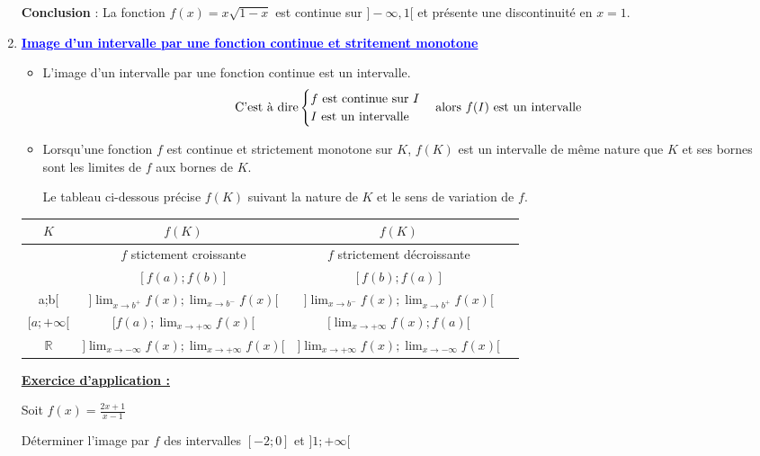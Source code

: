 \documentclass[12pt]{article}
\newcounter{exerciceapp}
\newcommand{\exerciceapp}{%
  \refstepcounter{exerciceapp}%
  \textbf{\textcolor{myorange}{Exercice d'application \theexerciceapp :}} \ignorespaces
}
\begin{document}
\begin{enumerate}[label=\arabic*)]
\textbf{Conclusion} : La fonction \( f(x) = x\sqrt{1 - x} \) est continue sur \( ]-\infty, 1[ \) et présente une discontinuité en \( x = 1 \).

\item \textbf{\textcolor{blue}{\underline{Image d’un intervalle par une fonction continue et stritement monotone}}}
\begin{itemize}
\item L’image d’un intervalle par une fonction continue est un intervalle.
\[
\text{C’est à dire}
\begin{cases}
\text{\( f \) est continue sur \( I \)}\\
\text{\( I \) est un intervalle}
\end{cases}
\text{alors \( f(I) \) est un intervalle}
\]

\item Lorsqu’une fonction \( f \) est continue et strictement monotone sur \( K \), \( f(K) \) est un intervalle de même nature que \( K \) et ses bornes sont les limites de \( f \) aux bornes de \( K \).

Le tableau ci-dessous précise \( f(K) \) suivant la nature de \( K \) et le sens de variation de \( f \).
\end{itemize}
\begin{tabular}{|c|c|c|c|}
\hline
\( K \) & \( f(K) \) & \( f(K) \)\\
\hline
				& \( f \) stictement croissante & \( f \) strictement décroissante\\
\hline
[a;b]		& \( [f(a);f(b)] \) & \( [f(b);f(a)] \)       \\
\hline
[a;b[	& \( [f(a);\lim_{x\to b^{-}}f(x)[ \) &	\( [\lim_{x\to b^{-}}f(x);f(a)[ \)	\\
\hline
]a;b[		& \( ]\lim_{x\to b^{+}}f(x);\lim_{x\to b^{-}}f(x)[ \) &	\( ]\lim_{x\to b^{-}}f(x);\lim_{x\to b^{+}}f(x)[ \)	\\
\hline
\( [a;+\infty[ \)	& \( [f(a);\lim_{x\to +\infty}f(x)[ \) &\( [\lim_{x\to +\infty}f(x);f(a)[ \)		\\
\hline
\( \mathbb{R} \)& \( ]\lim_{x\to -\infty}f(x);\lim_{x\to +\infty}f(x)[ \)&\( ]\lim_{x\to +\infty}f(x);\lim_{x\to -\infty}f(x)[ \)\\
\hline
\end{tabular}

			\textbf{\underline{\exerciceapp}}
			
				Soit \( f(x)=\frac{2x+1}{x-1} \)
				
				Déterminer l’image par \( f \) des intervalles \( [-2;0] \) et \( ]1;+\infty[ \)
				

\end{enumerate}
\end{document}
